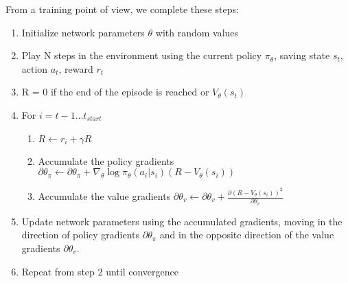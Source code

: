From a training point of view, we complete these steps:
\begin{enumerate}
\item Initialize network parameters \begin{math}\theta\end{math} with random values
\item
  Play N steps in the environment using the current
  policy \begin{math}\pi_\theta\end{math}, saving
    state $s_t$, action $a_t$, reward $r_t$
  \item  R = 0 if the end of the episode is reached or \begin{math}V_\theta(s_t)\end{math}
  \item
    For \begin{math}i = t-1 \ldots t_{start}\end{math}

    \begin{enumerate}
\item \begin{math}R \leftarrow r_i + \gamma R\end{math}
\item Accumulate the policy gradients \begin{math} \partial\theta_\pi \leftarrow
  \partial\theta_\pi + \nabla_\theta \log \pi_\theta(a_i|s_i)(R - V_\theta(s_i)) \end{math}
\item Accumulate the value gradients \begin{math}\partial \theta_v \leftarrow
  \partial \theta_v + \frac{\partial (R - V_\theta(s_i))^2}{\partial \theta_v}\end{math}
    \end{enumerate}

\item Update network parameters using the accumulated gradients, moving in the
  direction of policy gradients \begin{math}\partial\theta_\pi\end{math} and in
    the opposite direction of the value gradients \begin{math}\partial \theta_v\end{math}.
\item Repeat from step 2 until convergence

\end{enumerate}


